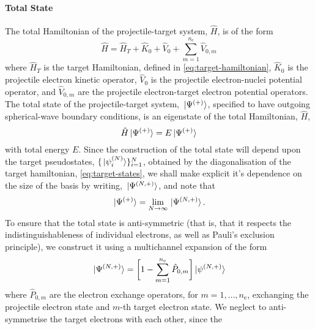 \documentclass[draft]{article}
\begin{document}
\paragraph{Total State}
\label{sec:total-state}

The total Hamiltonian of the projectile-target system, $\hat{H}$, is of the form
\begin{equation}
  \label{eq:total-hamiltonian}
  \hat{H}
  =
  \hat{H}_{T}
  +
  \hat{K}_{0}
  +
  \hat{V}_{0}
  +
  \sum_{m = 1}^{n_{\mathrm{e}}}
  \hat{V}_{0, m}
\end{equation}
where $\hat{H}_{T}$ is the target Hamiltonian, defined in
\autoref{eq:target-hamiltonian}, $\hat{K}_{0}$ is the projectile electron
kinetic operator, $\hat{V}_{0}$ is the projectile electron-nuclei potential
operator, and $\hat{V}_{0, m}$ are the projectile electron-target electron
potential operators.
The total state of the projectile-target system, $\ket*{\Psi^{(+)}}$,
specified to have outgoing spherical-wave boundary conditions, is an eigenstate
of the total Hamiltonian, $\hat{H}$,
\begin{equation}
  \label{eq:total-state}
  \hat{H}
  \ket*{\Psi^{\lr{+}}}
  =
  E
  \ket*{\Psi^{\lr{+}}}
\end{equation}
with total energy $E$.
Since the construction of the total state will depend upon the target
pseudostates, $\lbrace\ket*{\psi_{i}^{(N)}}\rbrace_{i = 1}^{N}$, obtained by the
diagonalisation of the target hamiltonian, \autoref{eq:target-states}, we shall
make explicit it's dependence on the size of the basis by writing,
$\ket*{\Psi^{(N, +)}}$, and note that
\begin{equation}
  \label{eq:total-state-expansion}
  \ket*{\Psi^{\lr{+}}}
  =
  \lim_{N \to \infty}
  \ket*{\Psi^{\lr{N, +}}}
  .
\end{equation}
To ensure that the total state is anti-symmetric (that is, that it respects the
indistinguishableness of individual electrons, as well as Pauli's exclusion
principle), we construct it using a multichannel expansion of the form
\begin{equation}
  \label{eq:total-state-multichannel}
  \ket*{\Psi^{\lr{N, +}}}
  =
  \lrsq[\bigg]
  {
    1
    -
    \sum_{m = 1}^{n_{\mathrm{e}}}
    \hat{P}_{0, m}
  }
  \ket*{\psi^{\lr{N, +}}}
\end{equation}
where $\hat{P}_{0, m}$ are the electron exchange operators, for
$m = 1, \dotsc, n_{\mathrm{e}}$, exchanging the projectile electron state and
$m$-th target electron state.
We neglect to anti-symmetrise the target electrons with each other, since the
\end{document}
